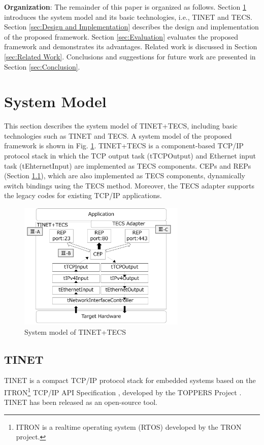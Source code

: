 \documentclass[conference]{IEEEtran/IEEEtran}
\begin{document}
{\bf Organization}: The remainder of this paper is organized as follows.
Section \ref{sec:System Model} introduces the system model and its basic technologies, i.e., TINET and TECS.
Section \ref{sec:Design and Implementation} describes the design and implementation of the proposed framework.
Section \ref{sec:Evaluation} evaluates the proposed framework and demonstrates its advantages.
Related work is discussed in Section \ref{sec:Related Work}.
Conclusions and suggestions for future work are presented in Section \ref{sec:Conclusion}.


\section{System Model}
\label{sec:System Model}

This section describes the system model of TINET+TECS, including basic technologies such as TINET and TECS.
A system model of the proposed framework is shown in Fig. \ref{fig:SystemModel}.
TINET+TECS is a component-based TCP/IP protocol stack in which the TCP output task (tTCPOutput) and Ethernet input task (tEhternetInput) are implemented as TECS components.
CEPs and REPs (Section \ref{sec:TINET}), which are also implemented as TECS components, dynamically switch bindings using the TECS method.
Moreover, the TECS adapter supports the legacy codes for existing TCP/IP applications.

\begin{figure}[t]
    \centering
    \includegraphics[width=8.0cm,clip]{figure/SystemModel.pdf}
    \caption{System model of TINET+TECS}
    \label{fig:SystemModel}
\end{figure}

\subsection{TINET}
\label{sec:TINET}

TINET is a compact TCP/IP protocol stack for embedded systems based on the ITRON\footnote{ITRON is a realtime operating system (RTOS) developed by the TRON project.} TCP/IP API Specification \cite{url:ITRON_TCP/IP_API_Spec}, developed by the TOPPERS Project \cite{url:TOPPERS}.
TINET has been released as an open-source tool.
\end{document}
